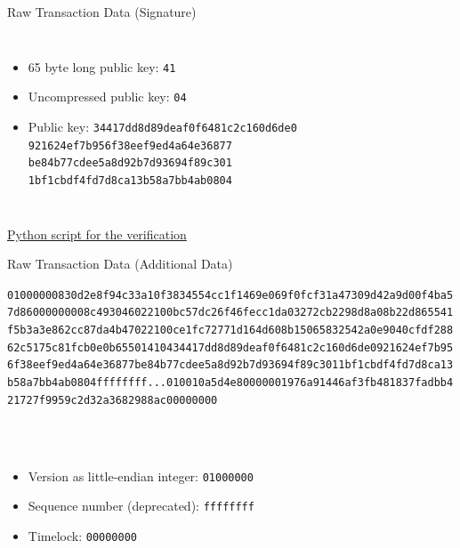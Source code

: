 \documentclass[]{beamer}
\begin{document}
\begin{frame}{Raw Transaction Data (Signature)}
\begin{columns}[T]
\begin{itemize}
	\item \alert<13>{65 byte long public key: \texttt{41}}
	\item \alert<14>{Uncompressed public key: \texttt{04}}
	\item \alert<15>{Public key: \texttt{34417dd8d89deaf0f6481c2c160d6de0\\
	921624ef7b956f38eef9ed4a64e36877\\
	be84b77cdee5a8d92b7d93694f89c301\\
	1bf1cbdf4fd7d8ca13b58a7bb4ab0804}}
\end{itemize}
\end{columns}
\vspace{0.5em}
\href{https://github.com/cifunibas/Bitcoin-Blockchain-Cryptoassets/blob/main/assets/scripts/satoshi_transaction.py}{\link Python script for the verification}
\end{frame}

\begin{frame}{Raw Transaction Data (Additional Data)}
\begin{scriptsize}
\texttt{\alert<2>{01000000}\textcolor{black!30}{830d2e8f94c33a10f3834554cc1f1469e069f0fcf31a47309d42a9d00f4ba5
7d86000000008c493046022100bc57dc26f46fecc1da03272cb2298d8a08b22d865541
f5b3a3e862cc87da4b47022100ce1fc72771d164d608b15065832542a0e9040cfdf288
62c5175c81fcb0e0b65501410434417dd8d89deaf0f6481c2c160d6de0921624ef7b95
6f38eef9ed4a64e36877be84b77cdee5a8d92b7d93694f89c3011bf1cbdf4fd7d8ca13
b58a7bb4ab0804}\alert<3>{ffffffff}...\textcolor{black!30}{010010a5d4e80000001976a91446af3fb481837fadbb4
21727f9959c2d32a3682988ac}\alert<4>{00000000}}
\end{scriptsize}
\vspace{1em}
\scriptsize \\
\\
\begin{itemize}
	\item \alert<2>{Version as little-endian integer: \texttt{01000000}}
	\item \alert<3>{Sequence number (deprecated): \texttt{ffffffff}}
	\item \alert<4>{Timelock: \texttt{00000000}}
\end{itemize}
\end{frame}
\end{document}
